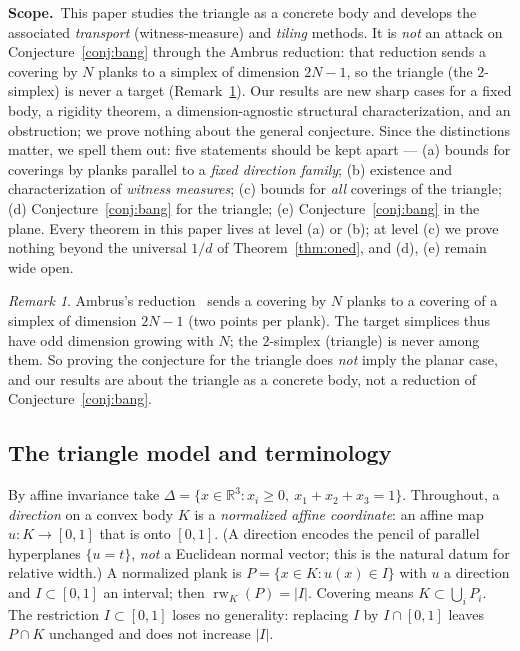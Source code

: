 \documentclass[11pt,reqno]{amsart}
\theoremstyle{plain}
\theoremstyle{definition}
\theoremstyle{remark}
\newtheorem{remark}[theorem]{Remark}
\newcommand{\rw}{\operatorname{rw}}
\newcommand{\R}{\mathbb{R}}
\begin{document}
\smallskip
\noindent\textbf{Scope.}\ This paper studies the triangle as a concrete body and
develops the associated \emph{transport} (witness-measure) and \emph{tiling}
methods. It is \emph{not} an attack on Conjecture~\ref{conj:bang} through the Ambrus
reduction: that reduction sends a covering by $N$ planks to a simplex of dimension
$2N-1$, so the triangle (the $2$-simplex) is never a target
(Remark~\ref{rem:ambrus}). Our results are new sharp cases for a fixed body, a
rigidity theorem, a dimension-agnostic structural characterization, and an
obstruction; we prove nothing about the general conjecture. Since the
distinctions matter, we spell them out: five statements should be kept apart ---
(a) bounds for coverings by planks parallel to a \emph{fixed direction family};
(b) existence and characterization of \emph{witness measures}; (c) bounds for
\emph{all} coverings of the triangle; (d) Conjecture~\ref{conj:bang} for the
triangle; (e) Conjecture~\ref{conj:bang} in the plane. Every theorem in this
paper lives at level (a) or (b); at level (c) we prove nothing beyond the
universal $1/d$ of Theorem~\ref{thm:oned}, and (d), (e) remain wide open.

\begin{remark}\label{rem:ambrus}
Ambrus's reduction~\cite{Ambrus} sends a covering by $N$ planks to a covering of a
simplex of dimension $2N-1$ (two points per plank). The target simplices thus have
odd dimension growing with $N$; the $2$-simplex (triangle) is never among them. So
proving the conjecture for the triangle does \emph{not} imply the planar case, and
our results are about the triangle as a concrete body, not a reduction of
Conjecture~\ref{conj:bang}.
\end{remark}

\subsection*{The triangle model and terminology}
By affine invariance take $\Delta=\{x\in\R^3:x_i\ge0,\ x_1+x_2+x_3=1\}$.
Throughout, a \emph{direction} on a convex body $K$ is a \emph{normalized
affine coordinate}: an affine map $u:K\to[0,1]$ that is onto $[0,1]$. (A
direction encodes the pencil of parallel hyperplanes $\{u=t\}$, \emph{not} a
Euclidean normal vector; this is the natural datum for relative width.) A
normalized plank is $P=\{x\in K: u(x)\in I\}$ with $u$ a direction and
$I\subset[0,1]$ an interval; then $\rw_K(P)=|I|$. Covering
means $K\subset\bigcup_i P_i$. The restriction $I\subset[0,1]$ loses no
generality: replacing $I$ by $I\cap[0,1]$ leaves $P\cap K$ unchanged and does
not increase $|I|$.
\end{document}
